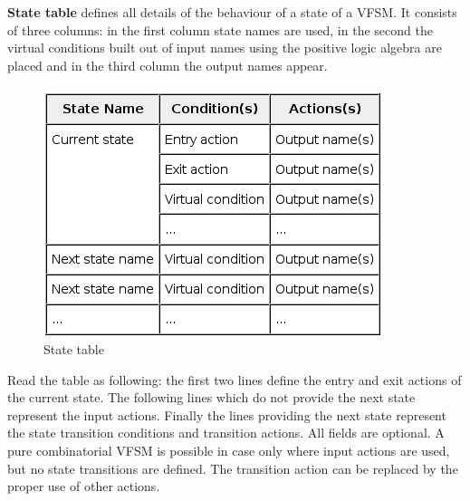 \newpage
\textbf{State table} defines all details of the behaviour of a state of a VFSM. It consists of three columns: in the first
column state names are used, in the second the virtual conditions built out of input names using the positive logic
algebra are placed and in the third column the output names appear.\\

\begin{figure}[htbp]
    \centering
    \includegraphics[scale=0.8]{images/state_table.png}
    \caption[State table]{State table}
\end{figure}

Read the table as following: the first two lines define the entry and exit actions of the current state. The following
lines which do not provide the next state represent the input actions. Finally the lines providing the next state
represent the state transition conditions and transition actions. All fields are optional. A pure combinatorial VFSM is
possible in case only where input actions are used, but no state transitions are defined. The transition action can be
replaced by the proper use of other actions.\\

